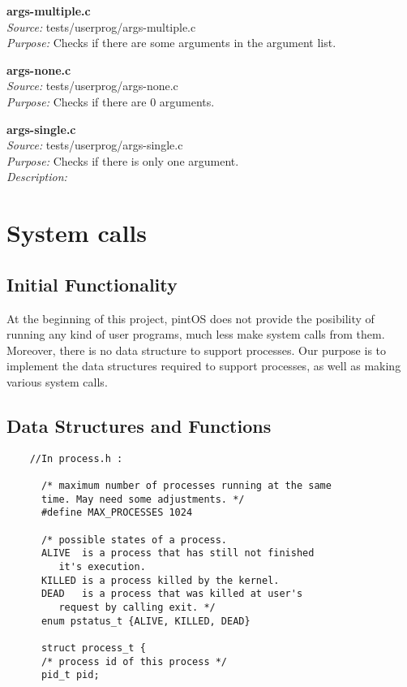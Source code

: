 {    \textbf{args-multiple.c} \\
    \textit{Source:} tests/userprog/args-multiple.c\\
    \textit{Purpose:} Checks if there are some arguments in 
	  the argument list.

    \textbf{args-none.c}\\
    \textit{Source:} tests/userprog/args-none.c\\
    \textit{Purpose:} Checks if there are 0 arguments.

    \textbf{args-single.c}\\
    \textit{Source:} tests/userprog/args-single.c\\
    \textit{Purpose:} Checks if there is only one argument.\\
    \textit{Description:}
    
\section{System calls}

    \subsection{Initial Functionality}

	At the beginning of this project, pintOS does not provide the posibility of running any kind of user programs, much less make system calls from them. Moreover, there is no data structure to support processes. Our purpose is to implement the data structures required to support processes, as well as making various system calls.
  
    \subsection{Data Structures and Functions}

    \begin{lstlisting}
    //In process.h :

      /* maximum number of processes running at the same 
      time. May need some adjustments. */
      #define MAX_PROCESSES 1024

      /* possible states of a process. 
	  ALIVE  is a process that has still not finished 
		 it's execution. 
	  KILLED is a process killed by the kernel.
	  DEAD 	 is a process that was killed at user's 
		 request by calling exit. */
      enum pstatus_t {ALIVE, KILLED, DEAD}

      struct process_t {
	  /* process id of this process */
	  pid_t pid;				


\end{lstlisting}}

